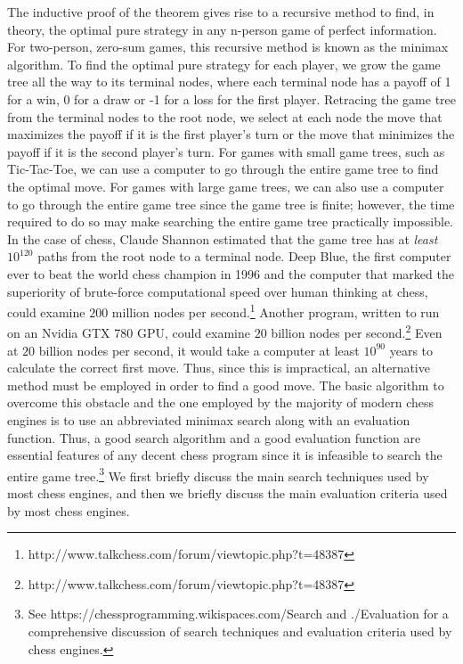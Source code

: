 \documentclass[12pt]{article}
\begin{document}
The inductive proof of the theorem gives rise to a recursive method to find, in theory, the optimal pure strategy in any n-person game of perfect information. For two-person, zero-sum games, this recursive method is known as the minimax algorithm. To find the optimal pure strategy for each player, we grow the game tree all the way to its terminal nodes, where each terminal node has a payoff of 1 for a win, 0 for a draw or -1 for a loss for the first player. Retracing the game tree from the terminal nodes to the root node, we select at each node the move that maximizes the payoff if it is the first player's turn or the move that minimizes the payoff if it is the second player's turn. For games with small game trees, such as Tic-Tac-Toe, we can use a computer to go through the entire game tree to find the optimal move. For games with large game trees, we can also use a computer to go through the entire game tree since the game tree is finite; however, the time required to do so may make searching the entire game tree practically impossible. In the case of chess, Claude Shannon estimated that the game tree has at \textit{least} $10^{120}$ paths from the root node to a terminal node. \cite{shannon} Deep Blue, the first computer ever to beat the world chess champion in 1996 and the computer that marked the superiority of brute-force computational speed over human thinking at chess, could examine $200$ million nodes per second.\footnote{http://www.talkchess.com/forum/viewtopic.php?t=48387} Another program, written to run on an Nvidia GTX 780 GPU, could examine $20$ billion nodes per second.\footnote{http://www.talkchess.com/forum/viewtopic.php?t=48387} Even at $20$ billion nodes per second, it would take a computer at least $10^{90}$ years to calculate the correct first move. Thus, since this is impractical, an alternative method must be employed in order to find a good move. The basic algorithm to overcome this obstacle and the one employed by the majority of modern chess engines is to use an abbreviated minimax search along with an evaluation function. Thus, a good search algorithm and a good evaluation function are essential features of any decent chess program since it is infeasible to search the entire game tree.\footnote{ See https://chessprogramming.wikispaces.com/Search and ./Evaluation for a comprehensive discussion of search techniques and evaluation criteria used by chess engines.} We first briefly discuss the main search techniques used by most chess engines, and then we briefly discuss the main evaluation criteria used by most chess engines.
\end{document}
